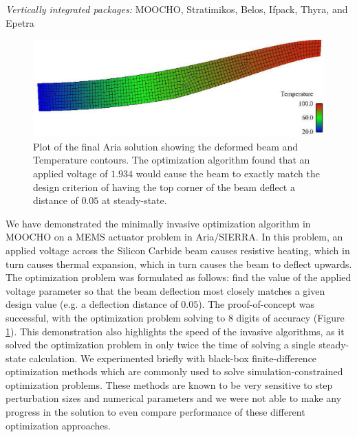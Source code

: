 \documentclass[pdf,ps2pdf,11pt]{SANDreport}
\begin{document}
{{}\noindent\textit{Vertically integrated packages:} MOOCHO, Stratimikos,
Belos, Ifpack, Thyra, and Epetra

{\bsinglespace
\begin{figure}
\begin{center}
\includegraphics*[angle=0,scale=0.50
]{SiC_dY0.1.eps}
\end{center}
\caption[Final optimization solution for Aria MEMS actuator design problem]{
\label{fig:ariaFinal}
Plot of the final Aria solution showing the deformed beam and Temperature
contours. The optimization algorithm found that an applied voltage of $1.934$
would cause the beam to exactly match the design criterion of having the top
corner of the beam deflect a distance of $0.05$ at steady-state.  }
\end{figure}
\esinglespace}

We have demonstrated the minimally invasive optimization algorithm in MOOCHO
on a MEMS actuator problem in Aria/SIERRA.  In this problem, an applied
voltage across the Silicon Carbide beam causes resistive heating, which in
turn causes thermal expansion, which in turn causes the beam to deflect
upwards. The optimization problem was formulated as follows: find the value of
the applied voltage parameter so that the beam deflection most closely matches
a given design value (e.g. a deflection distance of $0.05$). The proof-of-concept was successful, with the
optimization problem solving to $8$ digits of accuracy (Figure
{}\ref{fig:ariaFinal}). This demonstration also highlights the speed of the
invasive algorithms, as it solved the optimization problem in only twice the
time of solving a single steady-state calculation.  We experimented briefly
with black-box finite-difference optimization methods which are commonly
used to solve simulation-constrained optimization problems.  These methods
are known to be very sensitive to step perturbation sizes and numerical
parameters and we were not able to make any progress in the solution
to even compare performance of these different optimization approaches.

}
\end{document}
